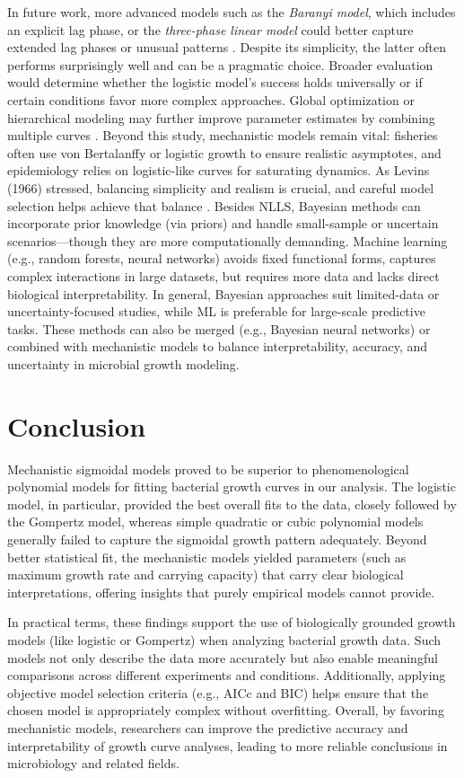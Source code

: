 \documentclass[11pt]{article}
\begin{document}
In future work, more advanced models such as the \textit{Baranyi model}, which includes an explicit lag phase, or the \textit{three-phase linear model} could better capture extended lag phases or unusual patterns \citep{BuchananEtAl1997}. Despite its simplicity, the latter often performs surprisingly well and can be a pragmatic choice. Broader evaluation would determine whether the logistic model’s success holds universally or if certain conditions favor more complex approaches. Global optimization or hierarchical modeling may further improve parameter estimates by combining multiple curves \citep{BolkerEtAl2013}. Beyond this study, mechanistic models remain vital: fisheries often use von Bertalanffy or logistic growth to ensure realistic asymptotes, and epidemiology relies on logistic-like curves for saturating dynamics. As Levins (1966) stressed, balancing simplicity and realism is crucial, and careful model selection helps achieve that balance \citep{Levins1966}. Besides NLLS, Bayesian methods can incorporate prior knowledge (via priors) and handle small-sample or uncertain scenarios—though they are more computationally demanding. Machine learning (e.g., random forests, neural networks) avoids fixed functional forms, captures complex interactions in large datasets, but requires more data and lacks direct biological interpretability. In general, Bayesian approaches suit limited-data or uncertainty-focused studies, while ML is preferable for large-scale predictive tasks. These methods can also be merged (e.g., Bayesian neural networks) or combined with mechanistic models to balance interpretability, accuracy, and uncertainty in microbial growth modeling.

\section{Conclusion}
Mechanistic sigmoidal models proved to be superior to phenomenological polynomial models for fitting bacterial growth curves in our analysis. The logistic model, in particular, provided the best overall fits to the data, closely followed by the Gompertz model, whereas simple quadratic or cubic polynomial models generally failed to capture the sigmoidal growth pattern adequately. Beyond better statistical fit, the mechanistic models yielded parameters (such as maximum growth rate and carrying capacity) that carry clear biological interpretations, offering insights that purely empirical models cannot provide. 

In practical terms, these findings support the use of biologically grounded growth models (like logistic or Gompertz) when analyzing bacterial growth data. Such models not only describe the data more accurately but also enable meaningful comparisons across different experiments and conditions. Additionally, applying objective model selection criteria (e.g., AICc and BIC) helps ensure that the chosen model is appropriately complex without overfitting. Overall, by favoring mechanistic models, researchers can improve the predictive accuracy and interpretability of growth curve analyses, leading to more reliable conclusions in microbiology and related fields.
\pagebreak



\end{document}
